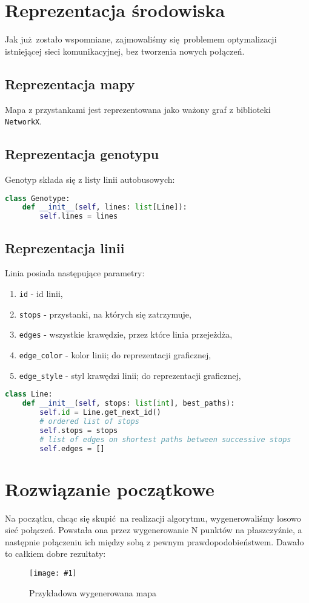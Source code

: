 \documentclass[12pt,a4paper,openright]{mwrep}
\newcommand{\imgcustomsize}[3]{
	\begin{figure}[H]
		\centering
		\texttt{[image: \#1]}
		\caption{#2}
	\end{figure}
}
\newcommand{\img}[2]{\imgcustomsize{#1}{#2}{0.8}}
\begin{document}
\section{Reprezentacja środowiska}
Jak już zostało wspomniane, zajmowaliśmy się problemem optymalizacji istniejącej sieci komunikacyjnej, bez tworzenia nowych połączeń.

\subsection{Reprezentacja mapy}
Mapa z przystankami jest reprezentowana jako ważony graf z biblioteki \lstinline{NetworkX}.

\subsection{Reprezentacja genotypu}
Genotyp składa się z listy linii autobusowych:
\begin{lstlisting}[language=Python]
class Genotype:
    def __init__(self, lines: list[Line]):
        self.lines = lines
\end{lstlisting}

\subsection{Reprezentacja linii}
Linia posiada następujące parametry:
\begin{enumerate}
    \item \lstinline{id} - id linii,
    \item \lstinline{stops} - przystanki, na których się zatrzymuje,
    \item \lstinline{edges} - wszystkie krawędzie, przez które linia przejeżdża,
    \item \lstinline{edge_color} - kolor linii; do reprezentacji graficznej,
    \item \lstinline{edge_style} - styl krawędzi linii; do reprezentacji graficznej,
\end{enumerate}


\begin{lstlisting}[language=Python]
class Line:
    def __init__(self, stops: list[int], best_paths):
        self.id = Line.get_next_id()
        # ordered list of stops
        self.stops = stops
        # list of edges on shortest paths between successive stops
        self.edges = []
\end{lstlisting}

\section{Rozwiązanie początkowe}
Na początku, chcąc się skupić na realizacji algorytmu, wygenerowaliśmy losowo sieć połączeń. Powstała ona przez wygenerowanie N punktów na płaszczyźnie, a następnie połączeniu ich między sobą z pewnym prawdopodobieństwem. Dawało to całkiem dobre rezultaty:
\img{map_seed_46}{Przykładowa wygenerowana mapa}
\end{document}
